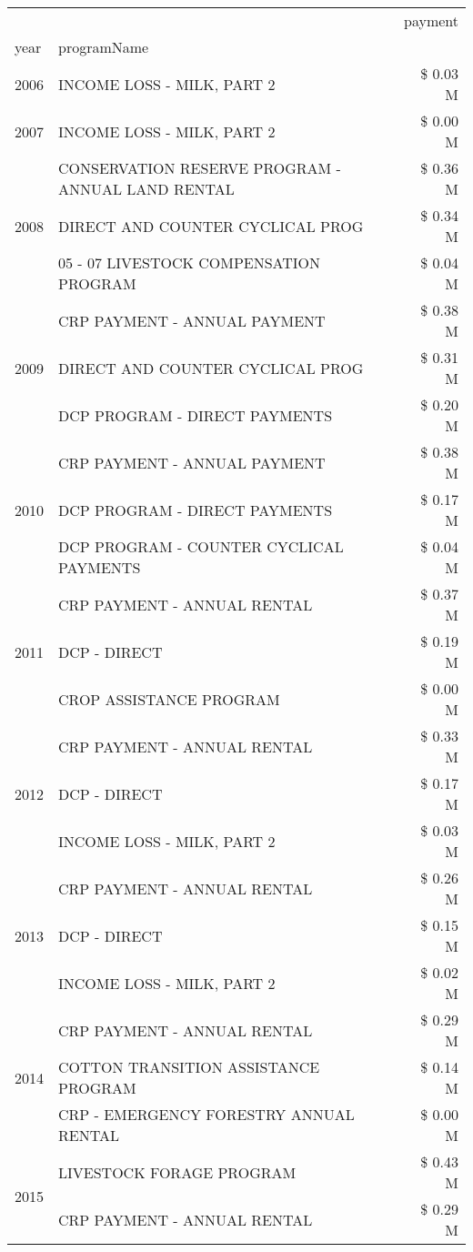 \begin{tabular}{llr}
\toprule
 &  & payment \\
year & programName &  \\
\midrule
2006 & INCOME LOSS - MILK, PART 2 & \$ 0.03 M \\
\cline{1-3}
2007 & INCOME LOSS - MILK, PART 2 & \$ 0.00 M \\
\cline{1-3}
\multirow[t]{3}{*}{2008} & CONSERVATION RESERVE PROGRAM - ANNUAL LAND RENTAL & \$ 0.36 M \\
 & DIRECT AND COUNTER CYCLICAL PROG & \$ 0.34 M \\
 & 05 - 07 LIVESTOCK COMPENSATION PROGRAM & \$ 0.04 M \\
\cline{1-3}
\multirow[t]{3}{*}{2009} & CRP PAYMENT - ANNUAL PAYMENT & \$ 0.38 M \\
 & DIRECT AND COUNTER CYCLICAL PROG & \$ 0.31 M \\
 & DCP PROGRAM - DIRECT PAYMENTS & \$ 0.20 M \\
\cline{1-3}
\multirow[t]{3}{*}{2010} & CRP PAYMENT - ANNUAL PAYMENT & \$ 0.38 M \\
 & DCP PROGRAM - DIRECT PAYMENTS & \$ 0.17 M \\
 & DCP PROGRAM - COUNTER CYCLICAL PAYMENTS & \$ 0.04 M \\
\cline{1-3}
\multirow[t]{3}{*}{2011} & CRP PAYMENT - ANNUAL RENTAL & \$ 0.37 M \\
 & DCP - DIRECT & \$ 0.19 M \\
 & CROP ASSISTANCE PROGRAM & \$ 0.00 M \\
\cline{1-3}
\multirow[t]{3}{*}{2012} & CRP PAYMENT - ANNUAL RENTAL & \$ 0.33 M \\
 & DCP - DIRECT & \$ 0.17 M \\
 & INCOME LOSS - MILK, PART 2 & \$ 0.03 M \\
\cline{1-3}
\multirow[t]{3}{*}{2013} & CRP PAYMENT - ANNUAL RENTAL & \$ 0.26 M \\
 & DCP - DIRECT & \$ 0.15 M \\
 & INCOME LOSS - MILK, PART 2 & \$ 0.02 M \\
\cline{1-3}
\multirow[t]{3}{*}{2014} & CRP PAYMENT - ANNUAL RENTAL & \$ 0.29 M \\
 & COTTON TRANSITION ASSISTANCE PROGRAM & \$ 0.14 M \\
 & CRP - EMERGENCY FORESTRY ANNUAL RENTAL & \$ 0.00 M \\
\cline{1-3}
\multirow[t]{3}{*}{2015} & LIVESTOCK FORAGE PROGRAM & \$ 0.43 M \\
 & CRP PAYMENT - ANNUAL RENTAL & \$ 0.29 M \\

\end{tabular}
